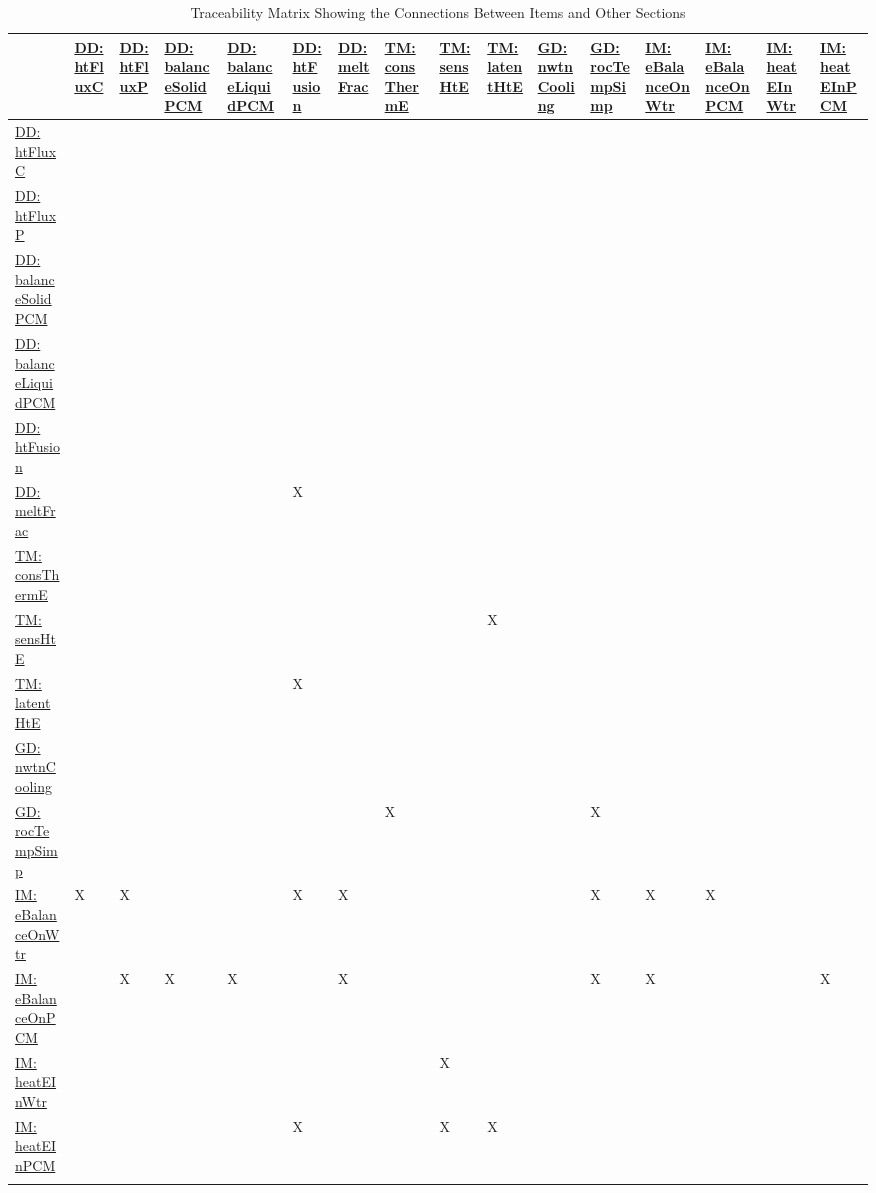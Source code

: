 \documentclass[12pt]{article}
\begin{document}
\begin{longtable}{l l l l l l l l l l l l l l l l}
\toprule
\textbf{} & \textbf{\hyperref[DD:htFluxC]{DD: htFluxC}} & \textbf{\hyperref[DD:htFluxP]{DD: htFluxP}} & \textbf{\hyperref[DD:balanceSolidPCM]{DD: balanceSolidPCM}} & \textbf{\hyperref[DD:balanceLiquidPCM]{DD: balanceLiquidPCM}} & \textbf{\hyperref[DD:htFusion]{DD: htFusion}} & \textbf{\hyperref[DD:meltFrac]{DD: meltFrac}} & \textbf{\hyperref[TM:consThermE]{TM: consThermE}} & \textbf{\hyperref[TM:sensHtE]{TM: sensHtE}} & \textbf{\hyperref[TM:latentHtE]{TM: latentHtE}} & \textbf{\hyperref[GD:nwtnCooling]{GD: nwtnCooling}} & \textbf{\hyperref[GD:rocTempSimp]{GD: rocTempSimp}} & \textbf{\hyperref[IM:eBalanceOnWtr]{IM: eBalanceOnWtr}} & \textbf{\hyperref[IM:eBalanceOnPCM]{IM: eBalanceOnPCM}} & \textbf{\hyperref[IM:heatEInWtr]{IM: heatEInWtr}} & \textbf{\hyperref[IM:heatEInPCM]{IM: heatEInPCM}}
\\
\midrule
\endhead
\hyperref[DD:htFluxC]{DD: htFluxC} &  &  &  &  &  &  &  &  &  &  &  &  &  &  & 
\\
\hyperref[DD:htFluxP]{DD: htFluxP} &  &  &  &  &  &  &  &  &  &  &  &  &  &  & 
\\
\hyperref[DD:balanceSolidPCM]{DD: balanceSolidPCM} &  &  &  &  &  &  &  &  &  &  &  &  &  &  & 
\\
\hyperref[DD:balanceLiquidPCM]{DD: balanceLiquidPCM} &  &  &  &  &  &  &  &  &  &  &  &  &  &  & 
\\
\hyperref[DD:htFusion]{DD: htFusion} &  &  &  &  &  &  &  &  &  &  &  &  &  &  & 
\\
\hyperref[DD:meltFrac]{DD: meltFrac} &  &  &  &  & X &  &  &  &  &  &  &  &  &  & 
\\
\hyperref[TM:consThermE]{TM: consThermE} &  &  &  &  &  &  &  &  &  &  &  &  &  &  & 
\\
\hyperref[TM:sensHtE]{TM: sensHtE} &  &  &  &  &  &  &  &  & X &  &  &  &  &  & 
\\
\hyperref[TM:latentHtE]{TM: latentHtE} &  &  &  &  & X &  &  &  &  &  &  &  &  &  & 
\\
\hyperref[GD:nwtnCooling]{GD: nwtnCooling} &  &  &  &  &  &  &  &  &  &  &  &  &  &  & 
\\
\hyperref[GD:rocTempSimp]{GD: rocTempSimp} &  &  &  &  &  &  & X &  &  &  & X &  &  &  & 
\\
\hyperref[IM:eBalanceOnWtr]{IM: eBalanceOnWtr} & X & X &  &  & X & X &  &  &  &  & X & X & X &  & 
\\
\hyperref[IM:eBalanceOnPCM]{IM: eBalanceOnPCM} &  & X & X & X &  & X &  &  &  &  & X & X &  &  & X
\\
\hyperref[IM:heatEInWtr]{IM: heatEInWtr} &  &  &  &  &  &  &  & X &  &  &  &  &  &  & 
\\
\hyperref[IM:heatEInPCM]{IM: heatEInPCM} &  &  &  &  & X &  &  & X & X &  &  &  &  &  & 
\\
\bottomrule
\caption{Traceability Matrix Showing the Connections Between Items and Other Sections}
\label{Table:TraceMatRefvsRef}
\end{longtable}
\end{document}
